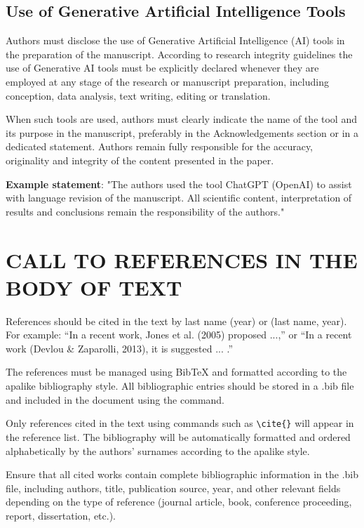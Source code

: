 \documentclass[12pt,fleqn]{article}
\begin{document}
\subsection{Use of Generative Artificial Intelligence Tools}

Authors must disclose the use of Generative Artificial Intelligence (AI) tools in the preparation of the manuscript. According to research integrity guidelines the use of Generative AI tools must be explicitly declared whenever they are employed at any stage of the research or manuscript preparation, including conception, data analysis, text writing, editing or translation.

When such tools are used, authors must clearly indicate the name of the tool and its purpose in the manuscript, preferably in the Acknowledgements section or in a dedicated statement. Authors remain fully responsible for the accuracy, originality and integrity of the content presented in the paper. 


\textbf{Example statement}: "The authors used the tool ChatGPT (OpenAI) to assist with language revision of the manuscript. All scientific content, interpretation of results and conclusions remain the responsibility of the authors."

\section{CALL TO REFERENCES IN THE BODY OF TEXT}
References should be cited in the text by last name (year) or (last name, year). For example: ``In a recent work, Jones et al. (2005) proposed ...,'' or ``In a recent work (Devlou \& Zaparolli, 2013), it is suggested ... .''

The references must be managed using BibTeX and formatted according to the apalike bibliography style. All bibliographic entries should be stored in a .bib file and included in the document using the \verb|| command.

Only references cited in the text using commands such as \verb|\cite{}| will appear in the reference list. The bibliography will be automatically formatted and ordered alphabetically by the authors’ surnames according to the apalike style.

Ensure that all cited works contain complete bibliographic information in the .bib file, including authors, title, publication source, year, and other relevant fields depending on the type of reference (journal article, book, conference proceeding, report, dissertation, etc.).
\end{document}
